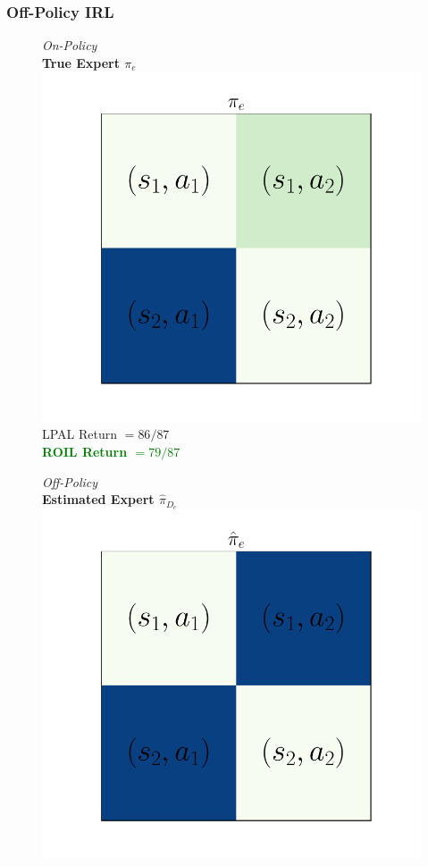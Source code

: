 \documentclass{beamer}
\begin{document}
\begin{frame}
\frametitle{Off-Policy IRL}
\begin{figure}
  \begin{center}
  \begin{minipage}{0.45\linewidth}
    \centering
    \emph{On-Policy}\\
    \textbf{True Expert $\pi_e$}
    \includegraphics[width=\linewidth]{./plots/all_state/ue.pdf}
    LPAL Return $= 86/87$ \\
    \textcolor{green}{\textbf{ROIL Return $= 79/87$}}
  \end{minipage}
  \begin{minipage}{0.45\linewidth}
    \centering
    \emph{Off-Policy}\\
    \textbf{Estimated Expert $\hat{\pi}_{D_e}$}
    \includegraphics[width=\linewidth]{./plots/all_state/uehat.pdf}

\end{minipage}
\end{center}
\end{figure}
\end{frame}
\end{document}
